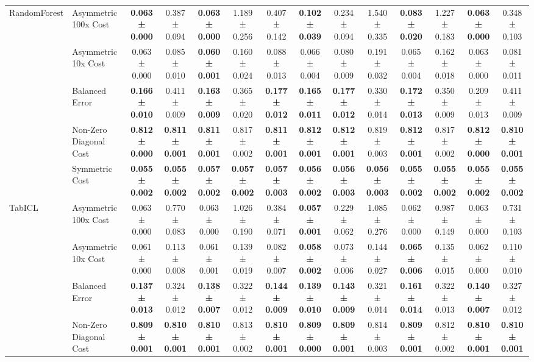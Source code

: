 \begin{table}[H]
{\begin{tabular}{llcccccccccccc}
\cline{1-14}
\multirow[t]{5}{*}{RandomForest} & Asymmetric 100x Cost & \textbf{0.063 ± 0.000} & 0.387 ± 0.094 & \textbf{0.063 ± 0.000} & 1.189 ± 0.256 & 0.407 ± 0.142 & \textbf{0.102 ± 0.039} & 0.234 ± 0.094 & 1.540 ± 0.335 & \textbf{0.083 ± 0.020} & 1.227 ± 0.183 & \textbf{0.063 ± 0.000} & 0.348 ± 0.103 \\
 & Asymmetric 10x Cost & 0.063 ± 0.000 & 0.085 ± 0.010 & \textbf{0.060 ± 0.001} & 0.160 ± 0.024 & 0.088 ± 0.013 & 0.066 ± 0.004 & 0.080 ± 0.009 & 0.191 ± 0.032 & 0.065 ± 0.004 & 0.162 ± 0.018 & 0.063 ± 0.000 & 0.081 ± 0.011 \\
 & Balanced Error & \textbf{0.166 ± 0.010} & 0.411 ± 0.009 & \textbf{0.163 ± 0.009} & 0.365 ± 0.020 & \textbf{0.177 ± 0.012} & \textbf{0.165 ± 0.011} & \textbf{0.177 ± 0.012} & 0.330 ± 0.014 & \textbf{0.172 ± 0.013} & 0.350 ± 0.009 & 0.209 ± 0.013 & 0.411 ± 0.009 \\
 & Non-Zero Diagonal Cost & \textbf{0.812 ± 0.000} & \textbf{0.811 ± 0.001} & \textbf{0.811 ± 0.001} & 0.817 ± 0.002 & \textbf{0.811 ± 0.001} & \textbf{0.812 ± 0.001} & \textbf{0.812 ± 0.001} & 0.819 ± 0.003 & \textbf{0.812 ± 0.001} & 0.817 ± 0.002 & \textbf{0.812 ± 0.000} & \textbf{0.810 ± 0.001} \\
 & Symmetric Cost & \textbf{0.055 ± 0.002} & \textbf{0.055 ± 0.002} & \textbf{0.057 ± 0.002} & \textbf{0.057 ± 0.002} & \textbf{0.057 ± 0.003} & \textbf{0.056 ± 0.002} & \textbf{0.056 ± 0.003} & \textbf{0.056 ± 0.003} & \textbf{0.055 ± 0.002} & \textbf{0.055 ± 0.002} & \textbf{0.055 ± 0.002} & \textbf{0.055 ± 0.002} \\
\cline{1-14}
\multirow[t]{5}{*}{TabICL} & Asymmetric 100x Cost & 0.063 ± 0.000 & 0.770 ± 0.083 & 0.063 ± 0.000 & 1.026 ± 0.190 & 0.384 ± 0.071 & \textbf{0.057 ± 0.001} & 0.229 ± 0.062 & 1.085 ± 0.276 & 0.062 ± 0.000 & 0.987 ± 0.149 & 0.063 ± 0.000 & 0.731 ± 0.103 \\
 & Asymmetric 10x Cost & 0.061 ± 0.000 & 0.113 ± 0.008 & 0.061 ± 0.001 & 0.139 ± 0.019 & 0.082 ± 0.007 & \textbf{0.058 ± 0.002} & 0.073 ± 0.006 & 0.144 ± 0.027 & \textbf{0.065 ± 0.006} & 0.135 ± 0.015 & 0.062 ± 0.000 & 0.110 ± 0.010 \\
 & Balanced Error & \textbf{0.137 ± 0.013} & 0.324 ± 0.012 & \textbf{0.138 ± 0.007} & 0.322 ± 0.012 & \textbf{0.144 ± 0.009} & \textbf{0.139 ± 0.010} & \textbf{0.143 ± 0.009} & 0.321 ± 0.014 & \textbf{0.161 ± 0.014} & 0.322 ± 0.013 & \textbf{0.140 ± 0.007} & 0.327 ± 0.012 \\
 & Non-Zero Diagonal Cost & \textbf{0.809 ± 0.001} & \textbf{0.810 ± 0.001} & \textbf{0.810 ± 0.001} & 0.813 ± 0.002 & \textbf{0.810 ± 0.001} & \textbf{0.809 ± 0.000} & \textbf{0.809 ± 0.001} & 0.814 ± 0.003 & \textbf{0.809 ± 0.001} & 0.812 ± 0.002 & \textbf{0.810 ± 0.001} & \textbf{0.810 ± 0.001} \\

\end{tabular}}
\end{table}
